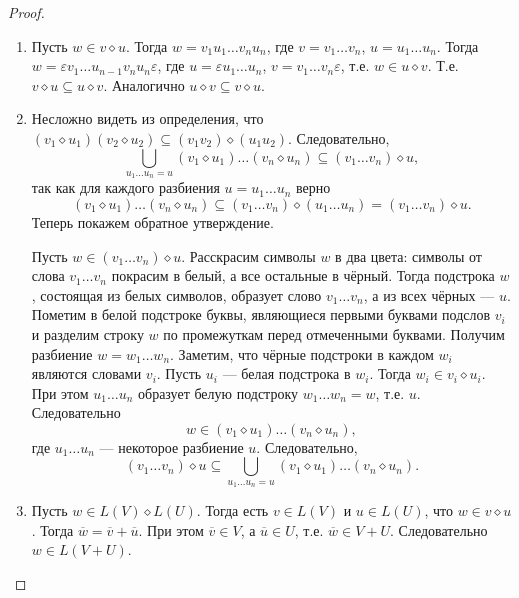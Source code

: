 \documentclass[12pt,a4paper]{article}
\begin{document}
\begin{problem}{8}
\begin{enumerate}
                \begin{proof}
                    \begin{enumerate}
                        \item Пусть $w \in v \diamond u$. Тогда $w = v_1 u_1 \dots v_n u_n$, где $v = v_1 \dots v_n$, $u = u_1 \dots u_n$. Тогда $w = \varepsilon v_1 \dots u_{n-1} v_n u_n \varepsilon$, где $u = \varepsilon u_1 \dots u_n$, $v = v_1 \dots v_n \varepsilon$, т.е. $w \in u \diamond v$. Т.е. $v \diamond u \subseteq u \diamond v$. Аналогично $u \diamond v \subseteq v \diamond u$.
                        \item Несложно видеть из определения, что $(v_1 \diamond u_1) (v_2 \diamond u_2) \subseteq (v_1 v_2) \diamond (u_1 u_2)$. Следовательно,
                            \[\bigcup_{u_1 \dots u_n = u} (v_1 \diamond u_1) \dots (v_n \diamond u_n) \subseteq (v_1 \dots v_n) \diamond u,\]
                            так как для каждого разбиения $u = u_1 \dots u_n$ верно
                            \[(v_1 \diamond u_1) \dots (v_n \diamond u_n) \subseteq (v_1 \dots v_n) \diamond (u_1 \dots u_n) = (v_1 \dots v_n) \diamond u.\]
                            Теперь покажем обратное утверждение.

                            Пусть $w \in (v_1 \dots v_n) \diamond u$. Расскрасим символы $w$ в два цвета: символы от слова $v_1 \dots v_n$ покрасим в белый, а все остальные в чёрный. Тогда подстрока $w$, состоящая из белых символов, образует слово $v_1 \dots v_n$, а из всех чёрных --- $u$. Пометим в белой подстроке буквы, являющиеся первыми буквами подслов $v_i$ и разделим строку $w$ по промежуткам перед отмеченными буквами. Получим разбиение $w = w_1 \dots w_n$. Заметим, что чёрные подстроки в каждом $w_i$ являются словами $v_i$. Пусть $u_i$ --- белая подстрока в $w_i$. Тогда $w_i \in v_i \diamond u_i$. При этом $u_1 \dots u_n$ образует белую подстроку $w_1 \dots w_n = w$, т.е. $u$. Следовательно
                            \[w \in (v_1 \diamond u_1) \dots (v_n \diamond u_n),\]
                            где $u_1 \dots u_n$ --- некоторое разбиение $u$. Следовательно,
                            \[(v_1 \dots v_n) \diamond u \subseteq \bigcup_{u_1 \dots u_n = u} (v_1 \diamond u_1) \dots (v_n \diamond u_n).\]
                        \item Пусть $w \in L(V) \diamond L(U)$. Тогда есть $v \in L(V)$ и $u \in L(U)$, что $w \in v \diamond u$. Тогда $\overline{w} = \overline{v} + \overline{u}$. При этом $\overline{v} \in V$, а $\overline{u} \in U$, т.е. $\overline{w} \in V + U$. Следовательно $w \in L(V + U)$.
                        

\end{enumerate}
\end{proof}
\end{enumerate}
\end{problem}
\end{document}
